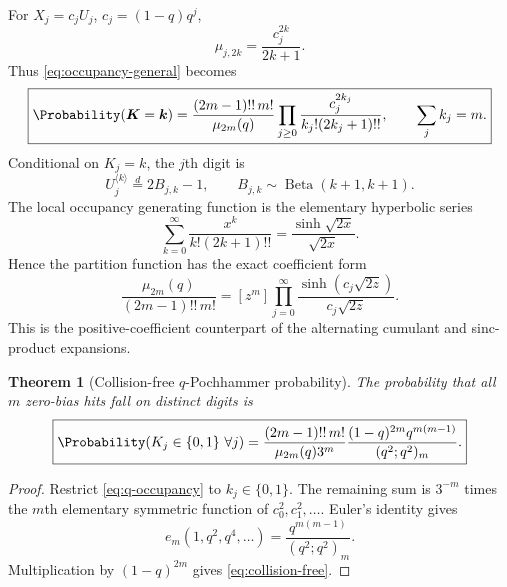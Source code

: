 \documentclass[11pt,oneside]{article}
\newtheorem{theorem}{Theorem}[section]
\theoremstyle{definition}
\theoremstyle{remark}
\begin{document}
For $X_j=c_jU_j$, $c_j=(1-q)q^j$,
\begin{equation}
 \mu_{j,2k}=\frac{c_j^{2k}}{2k+1}.                  \label{eq:uniform-coordinate-moment}
\end{equation}
Thus \eqref{eq:occupancy-general} becomes
\begin{equation}
 \boxed{
 \Probability(\bm K=\bm k)
 =\frac{(2m-1)!!\,m!}{\mu_{2m}(q)}
  \prod_{j\ge0}
  \frac{c_j^{2k_j}}{k_j!(2k_j+1)!!},
 \qquad \sum_jk_j=m.}                              \label{eq:q-occupancy}
\end{equation}
Conditional on $K_j=k$, the $j$th digit is
\begin{equation}
 U_j^{\langle k\rangle}
 \stackrel d=2B_{j,k}-1,
 \qquad B_{j,k}\sim\operatorname{Beta}(k+1,k+1).  \label{eq:uniform-k-tower}
\end{equation}
The local occupancy generating function is the elementary hyperbolic series
\begin{equation}
 \sum_{k=0}^{\infty}\frac{x^k}{k!(2k+1)!!}
 =\frac{\sinh\sqrt{2x}}{\sqrt{2x}}.                \label{eq:local-occupancy-gf}
\end{equation}
Hence the partition function has the exact coefficient form
\begin{equation}
 \frac{\mu_{2m}(q)}{(2m-1)!!\,m!}
 =[z^m]\prod_{j=0}^{\infty}
 \frac{\sinh(c_j\sqrt{2z})}{c_j\sqrt{2z}}.         \label{eq:occupancy-partition}
\end{equation}
This is the positive-coefficient counterpart of the alternating cumulant and
sinc-product expansions.

\begin{theorem}[Collision-free $q$-Pochhammer probability]
\label{thm:collision-free}
The probability that all $m$ zero-bias hits fall on distinct digits is
\begin{equation}
 \boxed{
 \Probability(K_j\in\{0,1\}\ \forall j)
 =\frac{(2m-1)!!\,m!}{\mu_{2m}(q)3^m}
  \frac{(1-q)^{2m}q^{m(m-1)}}{(q^2;q^2)_m}.}        \label{eq:collision-free}
\end{equation}
\end{theorem}

\begin{proof}
Restrict \eqref{eq:q-occupancy} to $k_j\in\{0,1\}$.  The remaining sum is
$3^{-m}$ times the $m$th elementary symmetric function of
$c_0^2,c_1^2,\ldots$.  Euler's identity gives
\begin{equation}
 e_m(1,q^2,q^4,\ldots)
 =\frac{q^{m(m-1)}}{(q^2;q^2)_m}.                  \label{eq:euler-elementary}
\end{equation}
Multiplication by $(1-q)^{2m}$ gives \eqref{eq:collision-free}.
\end{proof}
\end{document}
